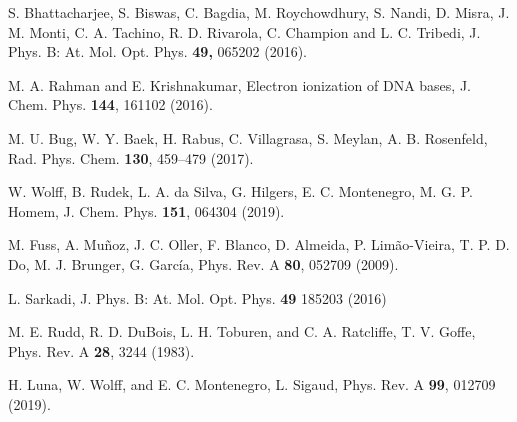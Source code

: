 \documentclass[10pt,showpacs,showkeys,twocolumn]{revtex4-1} %
\begin{document}
\begin{thebibliography}{}
S. Bhattacharjee, S. Biswas, C. Bagdia, M. Roychowdhury, S. Nandi, 
D. Misra, J. M. Monti, C. A. Tachino, R. D. Rivarola, C. Champion and 
L. C. Tribedi, J. 
Phys. B: At. Mol. Opt. Phys. \textbf{49,}  065202 (2016).

M. A. Rahman and E. Krishnakumar,
Electron ionization of DNA bases,
J. Chem. Phys. \textbf{144}, 161102 (2016).


M. U. Bug, W. Y. Baek, H. Rabus, C. Villagrasa, S. Meylan, 
A. B. Rosenfeld,
Rad. Phys. Chem. \textbf{130}, 459--479 (2017).


W. Wolff, B. Rudek, L. A. da Silva, G. Hilgers, E. C. Montenegro, 
M. G. P. Homem,
J. Chem. Phys. \textbf{151}, 064304 (2019).

M. Fuss, A. Muñoz, J. C. Oller, F. Blanco, D. Almeida, P. Limão-Vieira, 
T. P. D. Do, M. J. Brunger, G. Garc\'{i}a,
Phys. Rev. A \textbf{80}, 052709 (2009).

L. Sarkadi, 
J. Phys. B: At. Mol. Opt. Phys. \textbf{49} 185203 (2016)


M. E. Rudd, R. D. DuBois, L. H. Toburen, and C. A. Ratcliffe, 
T. V. Goffe, 
Phys. Rev. A \textbf{28}, 3244 (1983).

H. Luna, W. Wolff, and E. C. Montenegro, L. Sigaud, 
Phys. Rev. A \textbf{99}, 012709 (2019).


\end{thebibliography}
\end{document}
